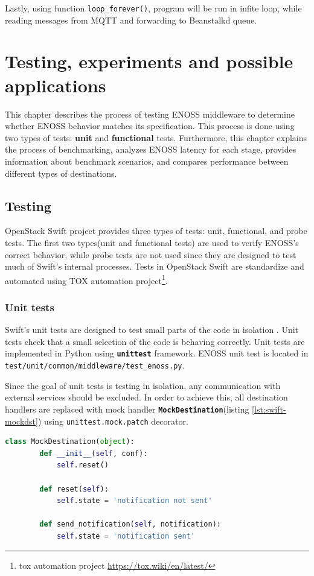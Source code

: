     Lastly, using function \texttt{loop\_forever()}, program will be run in infite loop, while reading messages from MQTT and forwarding to Beanstalkd queue.


\chapter{Testing, experiments and possible applications}
    This chapter describes the process of testing ENOSS middleware to determine whether ENOSS behavior matches its specification. This process is done using two types of tests: \textbf{unit} and \textbf{functional} tests. Furthermore, this chapter explains the process of benchmarking, analyzes ENOSS latency for each stage, provides information about benchmark scenarios, and compares performance between different types of destinations.

\section{Testing}
    OpenStack Swift project provides three types of tests: unit, functional, and probe tests. The first two types(unit and functional tests) are used to verify ENOSS's correct behavior, while probe tests are not used since they are designed to test much of Swift's internal processes.
    Tests in OpenStack Swift are standardize and automated using TOX automation project\footnote{tox automation project {\url{https://tox.wiki/en/latest/}}}.

    \subsection{Unit tests}
    Swift's unit tests are designed to test small parts of the code in isolation \cite{swiftContributing123}. Unit tests check that a small selection of the code is behaving correctly. Unit tests are implemented in Python using \textbf{\texttt{unittest}} framework. ENOSS unit test is located in \texttt{test/unit/common/middleware/test\_enoss.py}.

    Since the goal of unit tests is testing in isolation, any communication with external services should be excluded. In order to achieve this, all destination handlers are replaced with mock handler \textbf{\texttt{MockDestination}}(listing \ref{lst:swift-mockdst}) using \texttt{unittest.mock.patch} decorator.

    \begin{lstlisting}[language=Python, style=pythonStyle, caption=Mock class used to replace destination handlers in unit tests., label=lst:swift-mockdst]
    class MockDestination(object):
        def __init__(self, conf):
            self.reset()

        def reset(self):
            self.state = 'notification not sent'

        def send_notification(self, notification):
            self.state = 'notification sent'
    \end{lstlisting}

